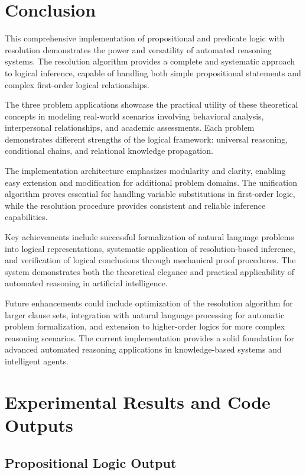 \documentclass[11pt,a4paper]{article}
\begin{document}
\section{Conclusion}

This comprehensive implementation of propositional and predicate logic with resolution demonstrates the power and versatility of automated reasoning systems. The resolution algorithm provides a complete and systematic approach to logical inference, capable of handling both simple propositional statements and complex first-order logical relationships.

The three problem applications showcase the practical utility of these theoretical concepts in modeling real-world scenarios involving behavioral analysis, interpersonal relationships, and academic assessments. Each problem demonstrates different strengths of the logical framework: universal reasoning, conditional chains, and relational knowledge propagation.

The implementation architecture emphasizes modularity and clarity, enabling easy extension and modification for additional problem domains. The unification algorithm proves essential for handling variable substitutions in first-order logic, while the resolution procedure provides consistent and reliable inference capabilities.

Key achievements include successful formalization of natural language problems into logical representations, systematic application of resolution-based inference, and verification of logical conclusions through mechanical proof procedures. The system demonstrates both the theoretical elegance and practical applicability of automated reasoning in artificial intelligence.

Future enhancements could include optimization of the resolution algorithm for larger clause sets, integration with natural language processing for automatic problem formalization, and extension to higher-order logics for more complex reasoning scenarios. The current implementation provides a solid foundation for advanced automated reasoning applications in knowledge-based systems and intelligent agents.

\section{Experimental Results and Code Outputs}

\subsection{Propositional Logic Output}
\end{document}
